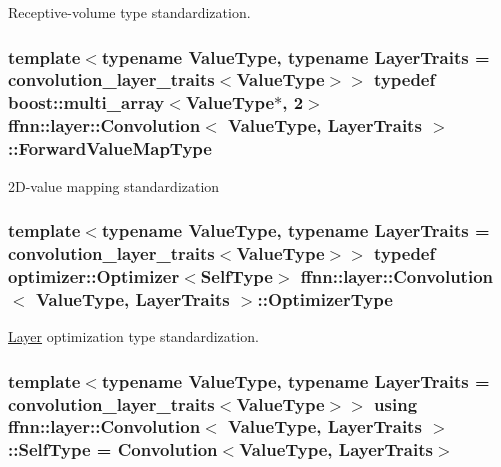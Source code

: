 Receptive-\/volume type standardization. 

\hypertarget{classffnn_1_1layer_1_1_convolution_a80b64b079d5e7d5a69779574989e8cce}{
\subsubsection[{Forward\-Value\-Map\-Type}]{\setlength{\rightskip}{0pt plus 5cm}template$<$typename Value\-Type, typename Layer\-Traits = convolution\-\_\-layer\-\_\-traits$<$\-Value\-Type$>$$>$ typedef boost\-::multi\-\_\-array$<$Value\-Type$\ast$, 2$>$ {\bf ffnn\-::layer\-::\-Convolution}$<$ Value\-Type, Layer\-Traits $>$\-::{\bf Forward\-Value\-Map\-Type}}}\label{classffnn_1_1layer_1_1_convolution_a80b64b079d5e7d5a69779574989e8cce}


2\-D-\/value mapping standardization 

\hypertarget{classffnn_1_1layer_1_1_convolution_a56d7e87a813fbd9954d283c0f7a32f9d}{
\subsubsection[{Optimizer\-Type}]{\setlength{\rightskip}{0pt plus 5cm}template$<$typename Value\-Type, typename Layer\-Traits = convolution\-\_\-layer\-\_\-traits$<$\-Value\-Type$>$$>$ typedef {\bf optimizer\-::\-Optimizer}$<${\bf Self\-Type}$>$ {\bf ffnn\-::layer\-::\-Convolution}$<$ Value\-Type, Layer\-Traits $>$\-::{\bf Optimizer\-Type}}}\label{classffnn_1_1layer_1_1_convolution_a56d7e87a813fbd9954d283c0f7a32f9d}


\hyperlink{classffnn_1_1layer_1_1_layer}{Layer} optimization type standardization. 

\hypertarget{classffnn_1_1layer_1_1_convolution_acbe0dcc4d5e3c8e65b4cd2677beca126}{
\subsubsection[{Self\-Type}]{\setlength{\rightskip}{0pt plus 5cm}template$<$typename Value\-Type, typename Layer\-Traits = convolution\-\_\-layer\-\_\-traits$<$\-Value\-Type$>$$>$ using {\bf ffnn\-::layer\-::\-Convolution}$<$ Value\-Type, Layer\-Traits $>$\-::{\bf Self\-Type} =  {\bf Convolution}$<$Value\-Type, Layer\-Traits$>$}}\label{classffnn_1_1layer_1_1_convolution_acbe0dcc4d5e3c8e65b4cd2677beca126}


